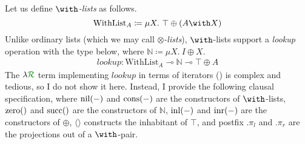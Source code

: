 \begin{example}
  Let us define \emph{$\with$-lists} as follows.
  \[
    \mathrm{WithList}_A \coloneqq \mu X.~\top \oplus \plr{A \with X}
  \]
  Unlike ordinary lists (which we may call \emph{$\otimes$-lists}),
  $\with$-lists support a \emph{lookup} operation with the type below, where
  $\mathbb N \coloneqq \mu X.~I \oplus X$.
  \begin{align*}
    \mathit{lookup} :
    \mathrm{WithList}_A \multimap \mathbb N \multimap \top \oplus A
  \end{align*}
  The $\name$ term implementing $\mathit{lookup}$ in terms of iterators
  () is complex and tedious, so I do not show it here.
  Instead, I provide the following clausal specification, where
  $\mathrm{nil}\plr{-}$ and $\mathrm{cons}\plr{-}$ are the constructors of
  $\with$-lists, $\mathrm{zero}\plr{}$ and $\mathrm{succ}\plr{}$ are the
  constructors of $\mathbb N$, $\mathrm{inl}\plr{-}$ and $\mathrm{inr}\plr{-}$
  are the constructors of $\oplus$, $\langle\rangle$ constructs the
  inhabitant of $\top$, and postfix $.\pi_l$ and $.\pi_r$ are the projections
  out of a $\with$-pair.


\end{example}
